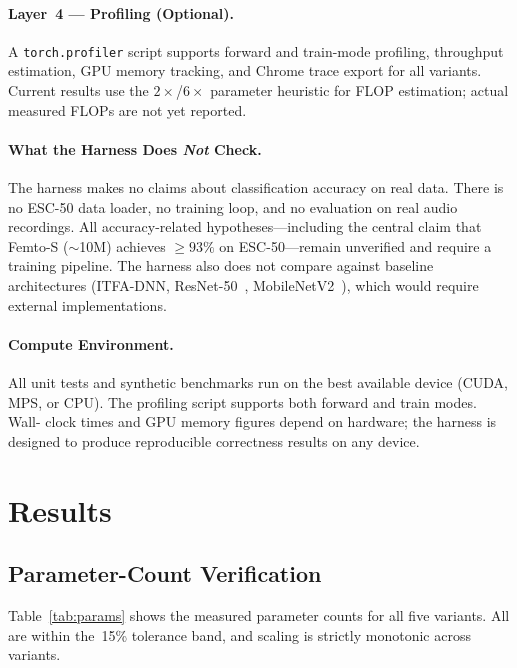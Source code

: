 \documentclass{article}
\begin{document}
\paragraph{Layer~4 --- Profiling (Optional).}
A \texttt{torch.profiler} script supports forward and train-mode profiling,
throughput estimation, GPU memory tracking, and Chrome trace export for all
variants. Current results use the $2\times$/$6\times$ parameter heuristic for
FLOP estimation; actual measured FLOPs are not yet reported.

\paragraph{What the Harness Does \emph{Not} Check.}
The harness makes no claims about classification accuracy on real data. There
is no ESC-50 data loader, no training loop, and no evaluation on real audio
recordings. All accuracy-related hypotheses---including the central claim
that Femto-S ($\sim$10M) achieves $\geq 93\%$ on ESC-50---remain unverified
and require a training pipeline. The harness also does not compare against
baseline architectures (ITFA-DNN, ResNet-50~\cite{he2016resnet}, MobileNetV2~\cite{sandler2018mobilenetv2}), which would require
external implementations.

\paragraph{Compute Environment.}
All unit tests and synthetic benchmarks run on the best available device (CUDA,
MPS, or CPU). The profiling script supports both forward and train modes. Wall-
clock times and GPU memory figures depend on hardware; the harness is designed
to produce reproducible correctness results on any device.

\section{Results}

\subsection{Parameter-Count Verification}

Table~\ref{tab:params} shows the measured parameter counts for all five
variants. All are within the~15\% tolerance band, and scaling is strictly
monotonic across variants.
\end{document}
